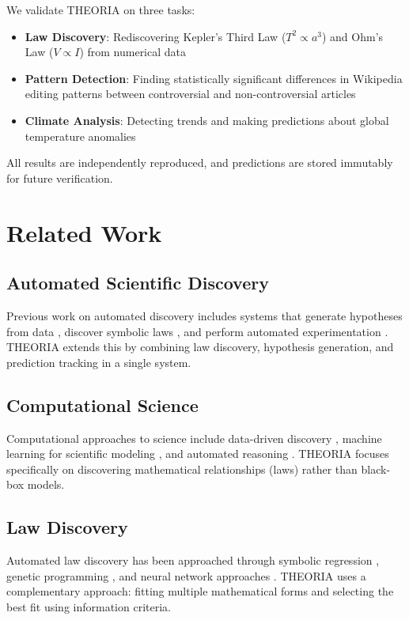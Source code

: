 \documentclass[journal,10pt]{IEEEtran}
\begin{document}
We validate THEORIA on three tasks:
\begin{itemize}
\item \textbf{Law Discovery}: Rediscovering Kepler's Third Law ($T^2 \propto a^3$) and Ohm's Law ($V \propto I$) from numerical data
\item \textbf{Pattern Detection}: Finding statistically significant differences in Wikipedia editing patterns between controversial and non-controversial articles
\item \textbf{Climate Analysis}: Detecting trends and making predictions about global temperature anomalies
\end{itemize}

All results are independently reproduced, and predictions are stored immutably for future verification.

\section{Related Work}

\subsection{Automated Scientific Discovery}

Previous work on automated discovery includes systems that generate hypotheses from data \cite{langley1987discovering}, discover symbolic laws \cite{schmidt2009distilling}, and perform automated experimentation \cite{king2009automating}. THEORIA extends this by combining law discovery, hypothesis generation, and prediction tracking in a single system.

\subsection{Computational Science}

Computational approaches to science include data-driven discovery \cite{data2021driven}, machine learning for scientific modeling \cite{ml2021science}, and automated reasoning \cite{reasoning2020automated}. THEORIA focuses specifically on discovering mathematical relationships (laws) rather than black-box models.

\subsection{Law Discovery}

Automated law discovery has been approached through symbolic regression \cite{cranmer2020discovering}, genetic programming \cite{koza1994genetic}, and neural network approaches \cite{udrescu2016ai}. THEORIA uses a complementary approach: fitting multiple mathematical forms and selecting the best fit using information criteria.
\end{document}
